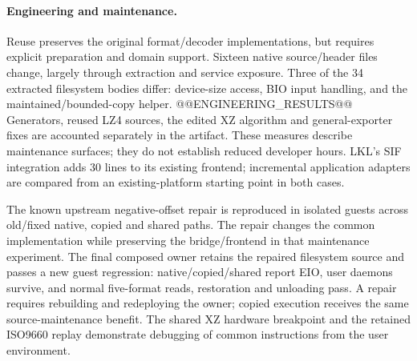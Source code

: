 \paragraph{Engineering and maintenance.}
Reuse preserves the original format/decoder implementations, but requires
explicit preparation and domain support. Sixteen native source/header files
change, largely through extraction and service exposure. Three of the
34 extracted filesystem bodies differ: device-size access, BIO input
handling, and the maintained/bounded-copy helper. @@ENGINEERING_RESULTS@@
Generators, reused LZ4 sources, the edited XZ algorithm and general-exporter
fixes are accounted separately in the artifact. These measures describe maintenance surfaces;
they do not establish reduced developer hours. LKL's SIF integration adds
30 lines to its existing frontend; incremental application adapters are
compared from an existing-platform starting point in both cases.

The known upstream negative-offset repair is reproduced in isolated guests
across old/fixed native, copied and shared paths. The repair changes the
common implementation while preserving the bridge/frontend in that
maintenance experiment. The final composed owner retains the repaired
filesystem source and passes a new guest regression: native/copied/shared
report EIO, user daemons survive, and normal five-format reads, restoration
and unloading pass. A repair requires rebuilding and redeploying the owner;
copied execution receives the same source-maintenance benefit. The shared
XZ hardware breakpoint and the retained ISO9660 replay demonstrate debugging
of common instructions from the user environment.

